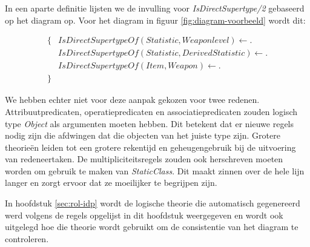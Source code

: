 In een aparte definitie lijsten we de invulling voor \textit{IsDirectSupertype/2} gebaseerd op het diagram op. Voor het diagram in figuur \ref{fig:diagram-voorbeeld} wordt dit:

\begin{align*}
\{
&\mathit{IsDirectSupertypeOf}(Statistic,Weaponlevel) \leftarrow .\\
&\mathit{IsDirectSupertypeOf}(Statistic,DerivedStatistic) \leftarrow .\\
&\mathit{IsDirectSupertypeOf}(Item,Weapon) \leftarrow .\\
\}
\end{align*}

We hebben echter niet voor deze aanpak gekozen voor twee redenen.
Attribuutpredicaten, operatiepredicaten en associatiepredicaten zouden logisch type \textit{Object} als argumenten moeten hebben. Dit betekent dat er nieuwe regels nodig zijn die afdwingen dat die objecten van het juiste type zijn. Grotere theorie\"en leiden tot een grotere rekentijd en geheugengebruik bij de uitvoering van redeneertaken.
De multipliciteitsregels zouden ook herschreven moeten worden om gebruik te maken van \textit{StaticClass}. Dit maakt zinnen over de hele lijn langer en zorgt ervoor dat ze moeilijker te begrijpen zijn.

\parbreak

In hoofdstuk \ref{sec:rol-idp} wordt de logische theorie die automatisch gegenereerd werd volgens de regels opgelijst in dit hoofdstuk weergegeven en wordt ook uitgelegd hoe die theorie wordt gebruikt om de consistentie van het diagram te controleren.